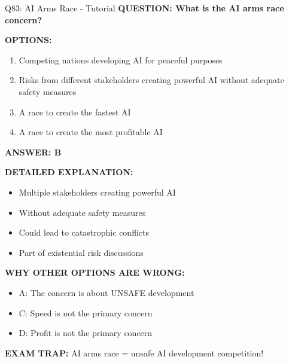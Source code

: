 \documentclass[8pt]{beamer}
\begin{document}
	\begin{frame}{Q83: AI Arms Race - Tutorial}
		\fontsize{6.5}{7.5}\selectfont
		\textbf{QUESTION: What is the AI arms race concern?}
		
		\vspace{0.1cm}
		\textbf{OPTIONS:}
		\begin{enumerate}
			\item Competing nations developing AI for peaceful purposes
			\item Risks from different stakeholders creating powerful AI without adequate safety measures
			\item A race to create the fastest AI
			\item A race to create the most profitable AI
		\end{enumerate}
		
		\vspace{0.1cm}
		\textcolor{myblue}{\textbf{ANSWER: B}}
		
		\vspace{0.1cm}
		\textbf{DETAILED EXPLANATION:}
		\begin{itemize}
			\item Multiple stakeholders creating powerful AI
			\item Without adequate safety measures
			\item Could lead to catastrophic conflicts
			\item Part of existential risk discussions
		\end{itemize}
		
		\vspace{0.1cm}
		\textcolor{myred}{\textbf{WHY OTHER OPTIONS ARE WRONG:}}
		\begin{itemize}
			\item \textcolor{myred}{A:} The concern is about UNSAFE development
			\item \textcolor{myred}{C:} Speed is not the primary concern
			\item \textcolor{myred}{D:} Profit is not the primary concern
		\end{itemize}
		
		\textcolor{myred}{\textbf{EXAM TRAP:}} AI arms race = \textcolor{myblue}{unsafe AI development competition}!
	\end{frame}
	
\end{document}
